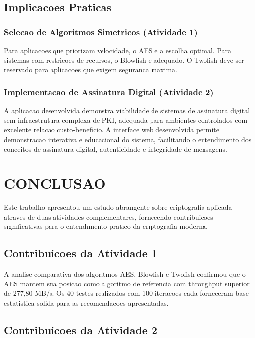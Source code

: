\documentclass[12pt,a4paper,oneside]{article}
\begin{document}
\subsection{Implicacoes Praticas}

\subsubsection{Selecao de Algoritmos Simetricos (Atividade 1)}

Para aplicacoes que priorizam velocidade, o AES e a escolha optimal. Para sistemas com restricoes de recursos, o Blowfish e adequado. O Twofish deve ser reservado para aplicacoes que exigem seguranca maxima.

\subsubsection{Implementacao de Assinatura Digital (Atividade 2)}

A aplicacao desenvolvida demonstra viabilidade de sistemas de assinatura digital sem infraestrutura complexa de PKI, adequada para ambientes controlados com excelente relacao custo-beneficio. A interface web desenvolvida permite demonstracao interativa e educacional do sistema, facilitando o entendimento dos conceitos de assinatura digital, autenticidade e integridade de mensagens.

\section{CONCLUSAO}

Este trabalho apresentou um estudo abrangente sobre criptografia aplicada atraves de duas atividades complementares, fornecendo contribuicoes significativas para o entendimento pratico da criptografia moderna.

\subsection{Contribuicoes da Atividade 1}

A analise comparativa dos algoritmos AES, Blowfish e Twofish confirmou que o AES mantem sua posicao como algoritmo de referencia com throughput superior de 277,80 MB/s. Os 40 testes realizados com 100 iteracoes cada forneceram base estatistica solida para as recomendacoes apresentadas.

\subsection{Contribuicoes da Atividade 2}
\end{document}
